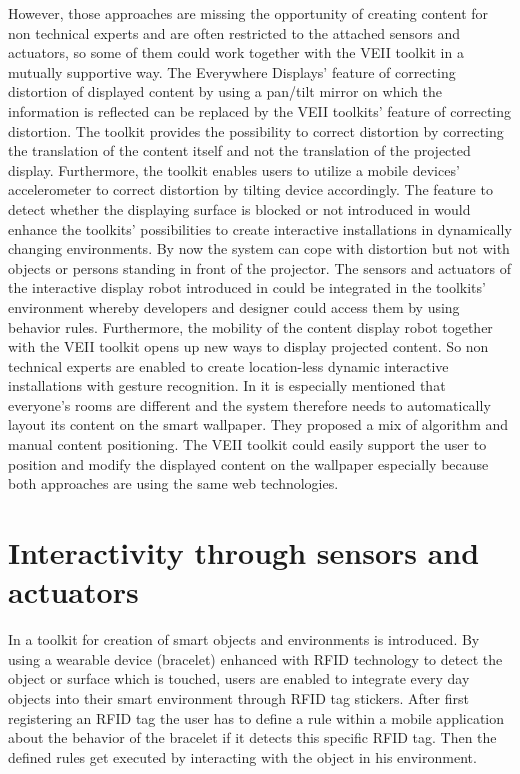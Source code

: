 However, those approaches are missing the opportunity of creating content for non technical experts and are often restricted to the attached sensors and actuators, so some of them could work together with the VEII toolkit in a mutually supportive way. 
The Everywhere Displays' feature of correcting distortion of displayed content by using a pan/tilt mirror on which the information is reflected \cite{Pinhanez2001a} can be replaced by the VEII toolkits' feature of correcting distortion. The toolkit provides the possibility to correct distortion by correcting the translation of the content itself and not the translation of the projected display. Furthermore, the toolkit enables users to utilize a mobile devices' accelerometer to correct distortion by tilting device accordingly.
The feature to detect whether the displaying surface is blocked or not introduced in \cite{Tokuda2003a} would enhance the toolkits' possibilities to create interactive installations in dynamically changing environments. By now the system can cope with distortion but not with objects or persons standing in front of the projector.
The sensors and actuators of the interactive display robot introduced in \cite{Choi2013} could be integrated in the toolkits' environment whereby developers and designer could access them by using behavior rules. Furthermore, the mobility of the content display robot together with the VEII toolkit opens up new ways to display projected content. So non technical experts are enabled to create location-less dynamic interactive installations with gesture recognition. In \cite{Campbell2014} it is especially mentioned that everyone's rooms are different and the system therefore needs to automatically layout its content on the smart wallpaper. They proposed a mix of algorithm and manual content positioning. The VEII toolkit could easily support the user to position and modify the displayed content on the wallpaper especially because both approaches are using the same web technologies.

\section{Interactivity through sensors and actuators}
In \cite{Benavides2014} a toolkit for creation of smart objects and environments is introduced. By using a wearable device (bracelet) enhanced with RFID technology to detect the object or surface which is touched, users are enabled to integrate every day objects into their smart environment through RFID tag stickers. After first registering an RFID tag the user has to define a rule within a mobile application about the behavior of the bracelet if it detects this specific RFID tag. Then the defined rules get executed by interacting with the object in his environment.

